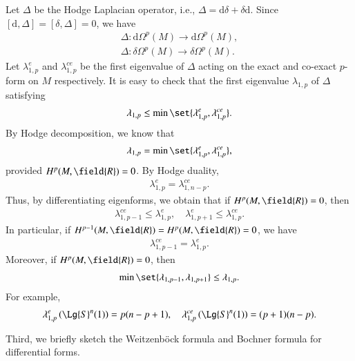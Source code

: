 \documentclass[12pt]{amsart}
\theoremstyle{plain}
\theoremstyle{remark}
\theoremstyle{definition}
\numberwithin{equation}{section}
\begin{document}
Let $\Delta$ be the Hodge Laplacian operator, i.e., $\Delta={\mathrm d}\delta+\delta{\mathrm d}$. Since $[{\mathrm d},\Delta]=[\delta,\Delta]=0$, we have
\begin{align*}
\Delta:{\mathrm d}\Omega^p(M){\longrightarrow}{\mathrm d}\Omega^p(M),\\
\Delta:\delta\Omega^p(M){\longrightarrow}\delta\Omega^p(M).
\end{align*}
Let $\lambda_{1,p}^e$ and $\lambda_{1,p}^{ce}$ be the first eigenvalue of $\Delta$ acting on the exact and co-exact $p$-form on $M$ respectively. It is easy to check that the first eigenvalue $\lambda_{1,p}$ of $\Delta$ satisfying
\begin{align*}
\lambda_{1,p}\leq\min\set{\lambda_{1,p}^e,\lambda_{1,p}^{ce}}.
\end{align*}
By Hodge decomposition, we know that
\begin{align*}
\lambda_{1,p}=\min\set{\lambda_{1,p}^e,\lambda_{1,p}^{ce}},
\end{align*}
provided $H^p(M,{\field{R}})=0$.
 By Hodge duality,
\begin{align*}
\lambda_{1,p}^{e}=\lambda_{1,n-p}^{ce}.
\end{align*}
Thus, by differentiating eigenforms, we obtain that if $H^p(M,{\field{R}})=0$, then
\begin{align*}
\lambda_{1,p-1}^{ce}\leq\lambda_{1,p}^{e},\quad\lambda_{1,p+1}^{e}\leq\lambda_{1,p}^{ce}.
\end{align*}
In particular, if $H^{p-1}(M,{\field{R}})=H^{p}(M,{\field{R}})=0$, we have
\begin{align*}
\lambda_{1,p-1}^{ce}=\lambda_{1,p}^{e}.
\end{align*}
Moreover, if $H^{p}(M,{\field{R}})=0$, then
\begin{align*}
\min\set{\lambda_{1,p-1},\lambda_{1,p+1}}\leq\lambda_{1,p}.
\end{align*}
For example,
\begin{align*}
\lambda_{1,p}^{e}\left(\Lg{S}^n(1)\right)=p(n-p+1),\quad\lambda_{1,p}^{ce}\left(\Lg{S}^n(1)\right)=(p+1)(n-p).
\end{align*}

Third, we briefly sketch the Weitzenb\"{o}ck formula and Bochner formula for differential forms.
\end{document}

